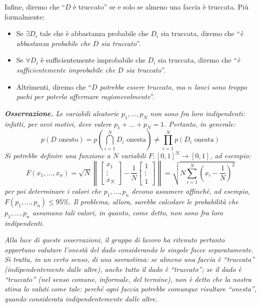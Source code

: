 \documentclass{article}
\begin{document}
\begin{appendices}
Infine, diremo che “$D$ è truccato” se e solo se almeno una faccia è truccata. Più formalmente:
\begin{itemize}
    \item Se $\exists D_i$ tale che è abbastanza probabile che $D_i$ sia truccata,
          diremo che “\emph{è abbastanza probabile che $D$ sia truccato}”.
    \item Se $\forall D_i$ è sufficientemente improbabile che $D_i$ sia truccata,
          diremo che “\emph{è sufficientemente improbabile che $D$ sia truccato}”.
    \item Altrimenti, diremo che
          “\emph{$D$ potrebbe essere truccato, ma $n$ lanci sono troppo pochi per poterlo
          affermare ragionevolmente}”.
\end{itemize}

\emph{\textbf{Osservazione.} Le variabili aleatorie $p_1,\dots,p_N$ non sono fra loro indipendenti:
infatti, per ovvi motivi, deve valere $p_1+\dots+p_N = 1$. Pertanto, in generale:}
\[p(D\text{ onesto})=p\left(\bigcap_{i=1}^N D_i\text{ onesta}\right)
\ne\prod_{i=1}^{N}p(D_i\text{ onesta})\]
\emph{Si potrebbe definire una funzione a $N$ variabili
$F:\left[0,1\right]^N\longrightarrow\left[0,1\right]$, ad esempio:}
\[F(x_1,\dots,x_n) = \sqrt{N}\left\lVert
\begin{bmatrix}x_1\\\vdots\\x_N\end{bmatrix} - \frac{1}{N}\begin{bmatrix}1\\\vdots\\1\end{bmatrix}
\right\rVert = \sqrt{N\sum_{i=1}^{N}\left(x_i-\frac{1}{N}\right)^2}\]
\emph{per poi determinare i valori che $p_1,\dots,p_n$ devono assumere affinché, ad esempio,
$F(p_1,\dots,p_n)\le95\%$. Il problema, allora, sarebbe calcolare le probabilità che
$p_1,\dots,p_n$ assumano tali valori, in quanto, come detto, non sono fra loro indipendenti.}

\emph{Alla luce di queste osservazioni, il gruppo di lavoro ha ritenuto pertanto
opportuno valutare l'onestà del dado considerando le singole facce separatamente.
Si tratta, in un certo senso, di una sovrastima: se almeno una faccia è “truccata”
(indipendentemente dalle altre), anche tutto il dado è “truccato”;
se il dado è “truccato” (nel senso comune, informale, del termine), non è detto che la nostra stima lo valuti come tale: perché ogni faccia
potrebbe comunque risultare “onesta”, quando considerata indipendentemente dalle
altre.}


\end{appendices}
\end{document}
